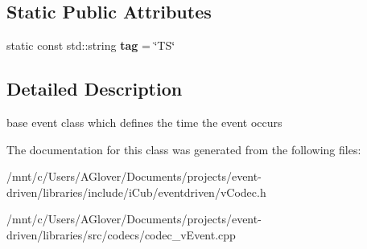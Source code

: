 \subsection*{Static Public Attributes}
\begin{DoxyCompactItemize}
\item 
\mbox{\label{classev_1_1vEvent_a54bcc0830c5993b56f1f47e23df1de8e}} 
static const std\+::string {\bfseries tag} = \char`\"{}TS\char`\"{}
\end{DoxyCompactItemize}


\subsection{Detailed Description}
base event class which defines the time the event occurs 

The documentation for this class was generated from the following files\+:\begin{DoxyCompactItemize}
\item 
/mnt/c/\+Users/\+A\+Glover/\+Documents/projects/event-\/driven/libraries/include/i\+Cub/eventdriven/v\+Codec.\+h\item 
/mnt/c/\+Users/\+A\+Glover/\+Documents/projects/event-\/driven/libraries/src/codecs/codec\+\_\+v\+Event.\+cpp\end{DoxyCompactItemize}

